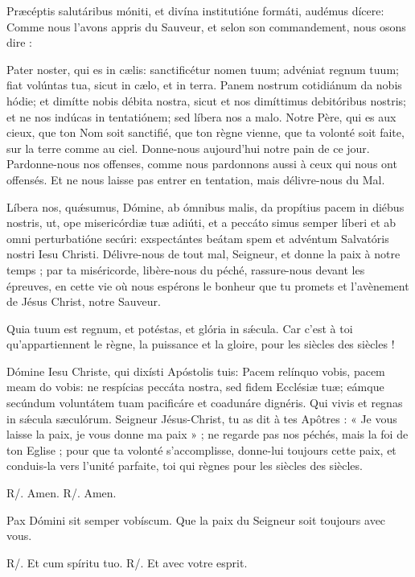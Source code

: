 \begin{paracol}{2}

\LigneParacol
{Præcéptis salutáribus móniti, et divína institutióne formáti, audémus dícere:}
{Comme nous l'avons appris du Sauveur, et selon son commandement, nous osons dire :}

\LigneParacol
{Pater noster, qui es in cælis: sanctificétur nomen tuum; advéniat regnum tuum; fiat volúntas tua, sicut in cælo, et in terra. Panem nostrum cotidiánum da nobis hódie; et dimítte nobis débita nostra, sicut et nos dimíttimus debitóribus nostris; et ne nos indúcas in tentatiónem; sed líbera nos a malo.}
{Notre Père, qui es aux cieux, que ton Nom soit sanctifié, que ton règne vienne, que ta volonté soit faite, sur la terre comme au ciel. Donne-nous aujourd'hui notre pain de ce jour. Pardonne-nous nos offenses, comme nous pardonnons aussi à ceux qui nous ont offensés. Et ne nous laisse pas entrer en tentation, mais délivre-nous du Mal.}

\LigneParacol
{Líbera nos, quǽsumus, Dómine, ab ómnibus malis, da propítius pacem in diébus nostris, ut, ope misericórdiæ tuæ adiúti, et a peccáto simus semper líberi et ab omni perturbatióne secúri: exspectántes beátam spem et advéntum Salvatóris nostri Iesu Christi.}
{Délivre-nous de tout mal, Seigneur, et donne la paix à notre temps ; par ta miséricorde, libère-nous du péché, rassure-nous devant les épreuves, en cette vie où nous espérons le bonheur que tu promets et l'avènement de Jésus Christ, notre Sauveur.}

\LigneParacol
{Quia tuum est regnum, et potéstas, et glória in sǽcula.}
{Car c'est à toi qu'appartiennent le règne, la puissance et la gloire, pour les siècles des siècles !}

\LigneParacol
{Dómine Iesu Christe, qui dixísti Apóstolis tuis: Pacem relínquo vobis, pacem meam do vobis: ne respícias peccáta nostra, sed fidem Ecclésiæ tuæ; eámque secúndum voluntátem tuam pacificáre et coadunáre dignéris. Qui vivis et regnas in sǽcula sæculórum.}
{Seigneur Jésus-Christ, tu as dit à tes Apôtres : « Je vous laisse la paix, je vous donne ma paix » ; ne regarde pas nos péchés, mais la foi de ton Eglise ; pour que ta volonté s’accomplisse, donne-lui toujours cette paix, et conduis-la vers l’unité parfaite, toi qui règnes pour les siècles des siècles.}

\LigneParacol
{R/. Amen.}
{R/. Amen.}

\LigneParacol
{Pax Dómini sit semper vobíscum.}
{Que la paix du Seigneur soit toujours avec vous.}

\LigneParacol
{R/. Et cum spíritu tuo.}
{R/. Et avec votre esprit.}

\end{paracol}
